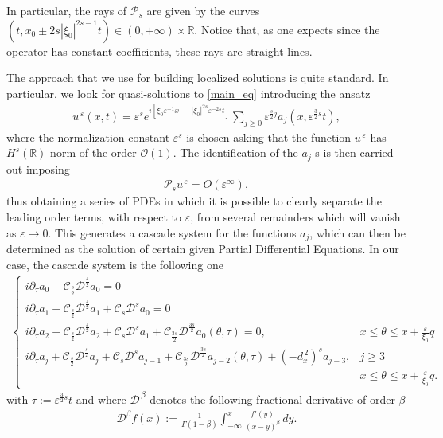 \documentclass[10pt]{article}
\newcommand{\ffl}[2]{(-d_x^{\,2})^{#1}#2}
\newcommand{\ue}[1]{#1^{\,\varepsilon}}
\newcommand{\RR}{\mathbb{R}}
\newcommand{\PP}{\mathcal{P}}
\begin{document}
In particular, the rays of $\PP_s$ are given by the curves $(t,x_0\pm 2s|\xi_0|^{2s-1}t)\in(0,+\infty)\times\RR$. Notice that, as one expects since the operator has constant coefficients, these rays are straight lines.

The approach that we use for building localized solutions is quite standard. In particular, we look for quasi-solutions to \eqref{main_eq} introducing the ansatz  
\begin{align}\label{ansatz}
	\ue{u}(x,t) = \varepsilon^s e^{i\left[\xi_0\varepsilon^{-1}x\,+\,|\xi_0|^{2s}\varepsilon^{-2s}t\right]}\sum_{j\geq 0}\varepsilon^{\frac{s}{2}j}a_j\left(x,\varepsilon^{\frac{3}{2}s}t\right),
\end{align}
where the normalization constant $\varepsilon^s$ is chosen asking that the function $\ue{u}$ has $H^s(\RR)$-norm of the order $\mathcal O(1)$. The identification of the $a_j$-s is then carried out imposing
\begin{align*}
\PP_s\ue{u} = O(\varepsilon^{\infty}), 
\end{align*} 
thus obtaining a series of PDEs in which it is possible to clearly separate the leading order terms, with respect to $\varepsilon$, from several remainders which will vanish as $\varepsilon\to 0$. This generates a cascade system for the functions $a_j$, which can then be determined as the solution of certain given Partial Differential Equations. In our case, the cascade system is the following one
\begin{align}\label{cascade_system}
	\begin{cases}
		i\partial_\tau a_0 + \mathcal{C}_{\frac s2} \mathcal{D}^{\frac{s}{2}} a_0 = 0  
		\\
		i\partial_\tau a_1 + \mathcal{C}_{\frac s2} \mathcal{D}^{\frac{s}{2}} a_1 + \mathcal{C}_{s} \mathcal{D}^{s} a_0 = 0  
		\\
		i\partial_\tau a_2 + \mathcal{C}_{\frac s2} \mathcal{D}^{\frac{s}{2}} a_2 + \mathcal{C}_{s} \mathcal{D}^{s} a_1 + \mathcal{C}_{\frac{3s}{2}} \mathcal{D}^{\frac{3s}{2}} a_0(\theta,\tau) = 0, & \displaystyle x\leq\theta\leq x+\frac{\varepsilon}{\xi_0}q
		\\
		i\partial_\tau a_j + \mathcal{C}_{\frac s2}\mathcal{D}^{\frac{s}{2}}a_j + \mathcal{C}_{s} \mathcal{D}^{s}a_{j-1} + 	\mathcal{C}_{\frac{3s}{2}} \mathcal{D}^{\frac{3s}{2}}a_{j-2}(\theta,\tau) + \ffl{s}{a_{j-3}}, & j\geq 3
		\\
		&\displaystyle x\leq\theta\leq x+\frac{\varepsilon}{\xi_0}q.  
	\end{cases}
\end{align}  
with $\tau:=\varepsilon^{\frac 32 s}t$ and where $\mathcal{D}^{\,\beta}$ denotes the following fractional derivative of order $\beta$
\begin{align*}
	\mathcal{D}^{\beta} f(x):= \frac{1}{\Gamma(1-\beta)}\int_{-\infty}^x \frac{f'(y)}{(x-y)^{\beta}}\,dy.
\end{align*} 
\end{document}
